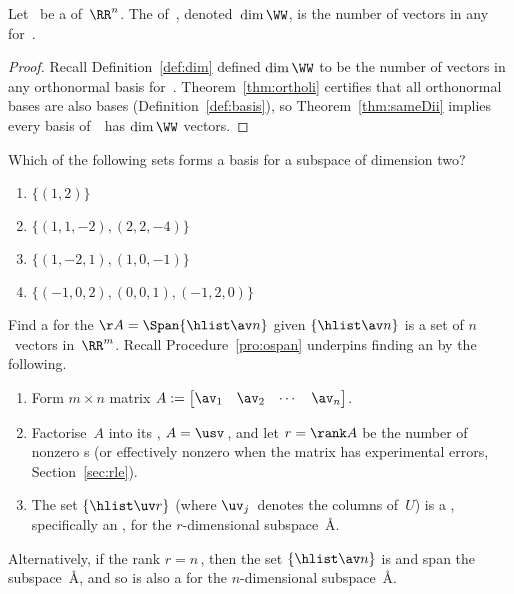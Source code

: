 \begin{theorem} \label{thm:dimii} 
Let \WW\ be a  of~\(\RR^n\).  
The  of~\WW, denoted~\(\dim\WW\), is the number of vectors in any  for~\WW. 
\end{theorem}

\begin{proof} 
Recall Definition~\ref{def:dim} defined \(\dim\WW\) to be the number of vectors in any orthonormal basis for~\WW.
Theorem~\ref{thm:ortholi} certifies that all orthonormal bases are also bases (Definition~\ref{def:basis}), so Theorem~\ref{thm:sameDii} implies every basis of~\WW\ has \(\dim\WW\) vectors.
\end{proof}




\begin{activity}
Which of the following sets forms a basis for a subspace of dimension two?
\begin{enumerate}
\item \(\{(1,2)\}\)
\item \(\{(1,1,-2),(2,2,-4)\}\)
\item \(\{(1,-2,1),(1,0,-1)\}\) \actans
\item \(\{(-1,0,2),(0,0,1),(-1,2,0)\}\)
\end{enumerate}
\end{activity}





\begin{procedure} \label{pro:bfs}
Find a  for the  \(\AA=\Span\{\hlist\av n\}\) given $\{\hlist\av n\}$ is a set of $n$~vectors in~\(\RR^m\).
Recall Procedure~\ref{pro:ospan} underpins finding an  by the following.
\begin{enumerate}
\item Form \(m\times n\) matrix $A:= \begin{bmatrix} \av_1 & \av_2& \cdots&\av_n \end{bmatrix}$. 
\item Factorise~\(A\) into its \svd, $A=\usv$\,, and let \(r=\rank A\) be the number of nonzero s (or effectively nonzero when the matrix has experimental errors, Section~\ref{sec:rle}).
\item The set \(\{\hlist\uv r\}\)  (where \(\uv_j\)~denotes the columns of~$U$) is a , specifically an , for the \(r\)-dimensional subspace~\AA.
\end{enumerate}
Alternatively, if the rank \(r=n\)\,, then the set \(\{\hlist\av n\}\) is  and span the subspace~\AA, and so is also a  for the \(n\)-dimensional subspace~\AA.
\end{procedure}



